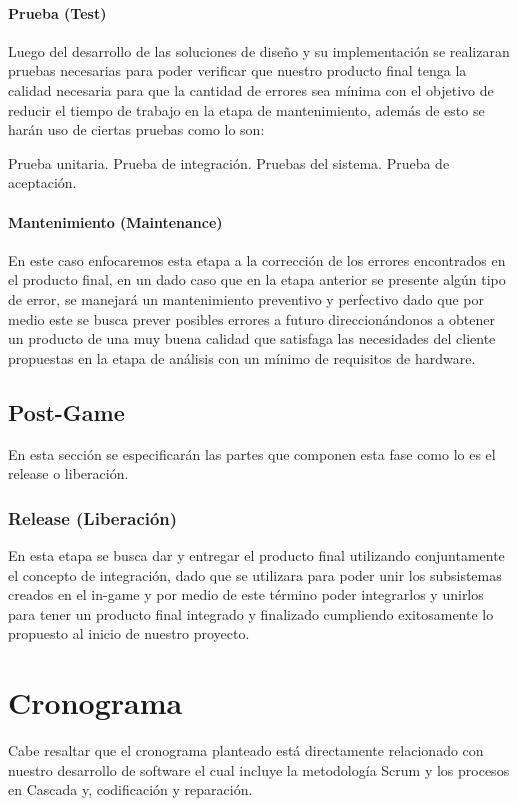 \paragraph{Prueba (Test)}
Luego del desarrollo de las soluciones de diseño y su implementación se realizaran pruebas necesarias para poder verificar que nuestro producto final tenga la calidad necesaria para que la cantidad de errores sea mínima con el objetivo de reducir el tiempo de trabajo en la etapa de mantenimiento, además de esto se harán uso de ciertas pruebas como lo son:

Prueba unitaria.
Prueba de integración.
Pruebas del sistema.
Prueba de aceptación.

\paragraph{Mantenimiento (Maintenance)}
En este caso enfocaremos esta etapa a la corrección de los errores encontrados en el producto final, en un dado caso que en la etapa anterior se presente algún tipo de error, se manejará un mantenimiento preventivo y perfectivo dado que por medio este se busca prever posibles errores a futuro direccionándonos a obtener un producto de una muy buena calidad que satisfaga las necesidades del cliente propuestas en la etapa de análisis con un mínimo de requisitos de hardware.


\subsection{Post-Game}
En esta sección se  especificarán las partes que componen esta fase como lo es el release o liberación.

\subsubsection{Release (Liberación)}
En esta etapa se busca dar y entregar el producto final utilizando conjuntamente el concepto de integración, dado que se utilizara para poder unir los subsistemas creados en el in-game y por medio de este término poder integrarlos y unirlos para tener un producto final integrado y finalizado cumpliendo exitosamente lo propuesto al inicio de nuestro proyecto.


\section{Cronograma}
Cabe resaltar que el cronograma planteado está directamente relacionado con nuestro desarrollo de software el cual incluye la metodología Scrum y los procesos en Cascada y, codificación y reparación.

